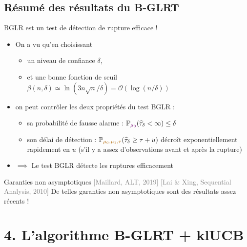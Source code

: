 \documentclass[11pt,french,ignorenonframetext,]{beamer}
\providecommand{\tightlist}{%
  \setlength{\itemsep}{0pt}\setlength{\parskip}{0pt}}
\begin{document}
\subsection{\hfill{}Résumé des résultats du B-GLRT\hfill{}}

\begin{frame}{BGLR est un test de détection de rupture efficace \dCooley{} !}

  \begin{itemize}
    \item
    On a vu qu'en choisissant
    \begin{itemize}\tightlist
      \item
      un niveau de confiance $\delta$,
      \item
      et une bonne fonction de seuil $\beta(n,\delta) \simeq \ln(3n \sqrt{n}/\delta) = \mathcal{O}(\log(n/\delta))$
    \end{itemize}
    \pause
    \item
    on peut contrôler les deux propriétés du test BGLR :
    \begin{itemize}\tightlist
      \item
        sa \alert{probabilité de fausse alarme} :
        $\mathbb{P}_{\textcolor{darkpurple}{\mu_0}}(\widehat{\tau}_\delta < \infty) \leq \delta$
      \item
        son \alert{délai de détection} :
        $\mathbb{P}_{\textcolor{gold}{\mu_0,\mu_1,\tau}} (\widehat{\tau}_{\delta} \geq \tau + u)$ décroît exponentiellement rapidement en $u$
        (s'il y a assez d'observations avant et après la rupture)
    \end{itemize}

    \item
    $\implies$ Le test BGLR détecte les ruptures efficacement \dCooley{}
  \end{itemize}

  \pause
  \begin{block}{Garanties non asymptotiques \dCooley{} \hfill{} \tiny{\textcolor{gray}{[Maillard, ALT, 2019]} \textcolor{gray}{[Lai \& Xing, Sequential Analysis, 2010]}}}
    De telles garanties \alert{non asymptotiques} sont des résultats assez récents !
  \end{block}

\end{frame}

\section{\hfill{}4. L'algorithme B-GLRT + klUCB\hfill{}}
\end{document}
